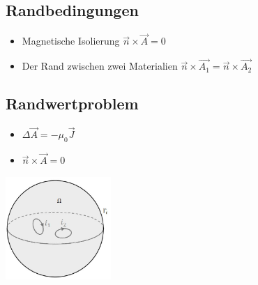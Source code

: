 \subsection{Randbedingungen}
\begin{itemize}
	\item Magnetische Isolierung $\vec{n} \times \vec{A} =0$
	\item Der Rand zwischen zwei Materialien $\vec{n} \times \vec{A_{1}}=\vec{n} \times \vec{A_{2}}$
\end{itemize}
\subsection{Randwertproblem}
\begin{minipage}{8cm}
	\begin{itemize}
		\item $\Delta\vec{A}=-\mu_{0}\vec{J}$
		\item $\vec{n} \times \vec{A} =0$
	\end{itemize}	
\end{minipage}
\begin{minipage}{8cm}
	\includegraphics[width=4cm]{images/Randwertproblem.jpg}
\end{minipage}
\clearpage
\pagebreak